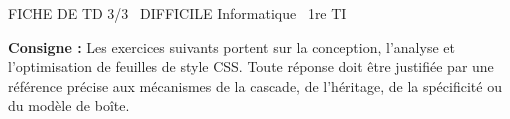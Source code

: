 \documentclass[11pt]{article}
\begin{document}
\begin{tcolorbox}[enhanced,colback=popink,colframe=popink,arc=10pt,boxrule=0pt,left=12pt,right=12pt,top=9pt,bottom=9pt]
{\color{white}\popxbold\small FICHE DE TD 3/3 \textbullet\ DIFFICILE \hfill Informatique \textbullet\ 1re TI\par}
\end{tcolorbox}
\vspace{4pt}
\noindent \textbf{Consigne :} Les exercices suivants portent sur la conception, l'analyse et l'optimisation de feuilles de style CSS. Toute réponse doit être justifiée par une référence précise aux mécanismes de la cascade, de l'héritage, de la spécificité ou du modèle de boîte.
\end{document}
